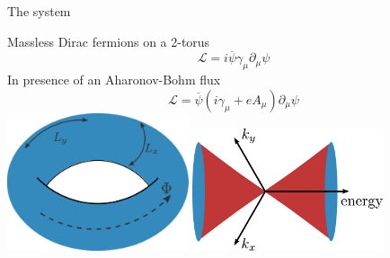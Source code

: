 \documentclass[11pt,aspectratio=169]{beamer}
\begin{document}
\begin{frame}{The system}

{Massless Dirac fermions on a 2-torus}
\[\mathcal{L} = i\overline\psi\gamma_\mu\partial_\mu \psi\]
{In presence of an Aharonov-Bohm flux}
\[\mathcal{L} = \overline\psi \left(i\gamma_\mu + eA_\mu\right)\partial_\mu \psi\]
\includegraphics[width=0.4\textwidth]{figures/torus.pdf}
\hspace*{\fill}
\includegraphics[width=0.42\textwidth]{figures/dirac.pdf}

\end{frame}
\end{document}

